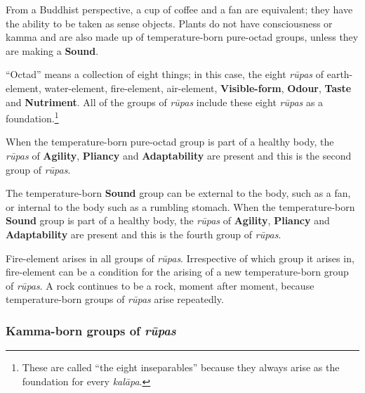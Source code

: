 From a Buddhist perspective, a cup of coffee and a fan are equivalent; they have the ability to be taken as sense objects. Plants do not have consciousness or kamma and are also made up of temperature-born pure-octad groups, unless they are making a \textbf{Sound}.

“Octad” means a collection of eight things; in this case, the eight \textit{rūpas} of earth-element, water-element, fire-element, air-element, \textbf{Visible-form}, \textbf{Odour}, \textbf{Taste} and \textbf{Nutriment}. All of the groups of \textit{rūpas} include these eight \textit{rūpas} as a foundation.\footnote{These are called “the eight inseparables” because they always arise as the foundation for every \textit{kalāpa}.}

When the temperature-born pure-octad group is part of a healthy body, the \textit{rūpas} of \textbf{Agility}, \textbf{Pliancy} and \textbf{Adaptability} are present and this is the second group of \textit{rūpas}.

The temperature-born \textbf{Sound} group can be external to the body, such as a fan, or internal to the body such as a rumbling stomach. When the temperature-born \textbf{Sound} group is part of a healthy body, the \textit{rūpas} of \textbf{Agility}, \textbf{Pliancy} and \textbf{Adaptability} are present and this is the fourth group of \textit{rūpas}.

Fire-element arises in all groups of \textit{rūpas}. Irrespective of which group it arises in, fire-element can be a condition for the arising of a new temperature-born group of \textit{rūpas}. A rock continues to be a rock, moment after moment, because temperature-born groups of \textit{rūpas} arise repeatedly.

\subsubsection*{Kamma-born groups of \textit{rūpas}}

